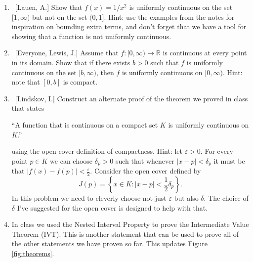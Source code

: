 \documentclass[10pt]{article}
\theoremstyle{definition}
\begin{document}
\begin{enumerate}

\item  ~[Lauen, A.] Show that $f(x) = 1/x^2$ is uniformly continuous on the set $[1,\infty)$ but not on the set $(0,1]$.  Hint: use the examples from the notes for inspiration on bounding extra terms, and don't forget that we have a tool for showing that a function is not uniformly continuous. 
	

\item  ~[Everyone, Lewis, J.] Assume that $f:[0,\infty) \to \mathbb{R}$ is continuous at every point in its domain.  Show that if there exists $b > 0$ such that $f$ is uniformly continuous on the set $[b,\infty)$, then $f$ is uniformly continuous on $[0,\infty)$.  Hint: note that $[0,b]$ is compact.


\item  ~[Lindskov, I.] Construct an alternate proof of the theorem we proved in class that states

``A function that is continuous on a compact set $K$ is uniformly continuous on $K$.''

using the open cover definition of compactness.  Hint: let $\varepsilon > 0$.  For every point $p \in K$ we can choose $\delta_p > 0$ such that whenever $|x-p| < \delta_p$ it must be that $|f(x) - f(p)| < \frac{\varepsilon}{2}$.  Consider the open cover defined by $$J(p) = \left\{ x \in K: |x-p| < \frac{1}{2}\delta_p \right\}.$$  In this problem we need to cleverly choose not just $\varepsilon$ but also $\delta$.  The choice of $\delta$ I've suggested for the open cover is designed to help with that.
	

\item  In class we used the Nested Interval Property to prove the Intermediate Value Theorem (IVT).  This is another statement that can be used to prove all of the other statements we have proven so far.  This updates Figure \ref{fig:theorems}.

	\begin{figure}[h]
	\begin{center}
\end{center}
\end{figure}
\end{enumerate}
\end{document}
